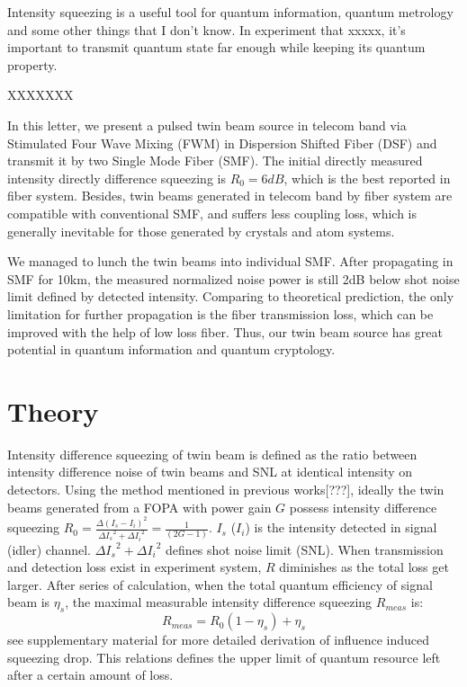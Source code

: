 \documentclass[9pt,twocolumn,twoside]{osajnl}
\begin{document}
Intensity squeezing is a useful tool for quantum information, quantum metrology and some other things that I don't know. In experiment that xxxxx, it's important to transmit quantum state far enough while keeping its quantum property.

XXXXXXX

In this letter, we present a pulsed twin beam source in telecom band via Stimulated Four Wave Mixing (FWM) in Dispersion Shifted Fiber (DSF) and transmit it by two Single Mode Fiber (SMF). The initial directly measured intensity directly difference squeezing is $R_{0}= 6 dB$, which is the best reported in fiber system. Besides, twin beams generated in telecom band by fiber system are compatible with conventional SMF, and suffers less coupling loss, which is generally inevitable for those generated by crystals and atom systems.%

We managed to lunch the twin beams into individual SMF.
After propagating in SMF for 10km, the measured normalized noise power is still 2dB below shot noise limit defined by detected intensity. Comparing to theoretical prediction, the only limitation for further propagation is the fiber transmission loss, which can be improved with the help of low loss fiber. Thus, our twin beam source has great potential in quantum information and quantum cryptology.

\section{Theory}
Intensity difference squeezing of twin beam is defined as the ratio between intensity difference noise of twin beams and SNL at identical intensity on detectors.
Using the method mentioned in previous works\cite{guo12}[???], ideally the twin beams generated from a FOPA with power gain $G$ possess intensity difference squeezing \(R_0=\frac{\Delta{(I_s-I_i)}^2}{\Delta{I_s}^2+\Delta{I_i}^2}=\frac{1}{(2G-1)}\).
$I_s$ ($I_i$) is the intensity detected in signal (idler) channel. $\Delta{I_s}^2+\Delta{I_i}^2$ defines shot noise limit (SNL). When transmission and detection loss exist in experiment system, $R$ diminishes as the total loss get larger.
After series of calculation, when the total quantum efficiency of signal beam is $\eta_s$, the maximal measurable intensity difference squeezing $R_{meas}$ is:
\begin{equation}
R_{meas}=R_0(1-\eta_s)+\eta_s
\label{eq:loss}
\end{equation}see supplementary material for more detailed derivation of influence induced squeezing drop.
This relations defines the upper limit of quantum resource left after a certain amount of loss.
\end{document}
